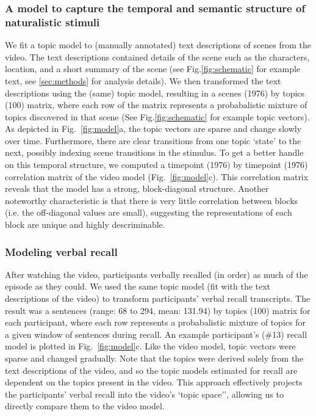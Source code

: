 \documentclass{article}
\begin{document}
{\subsubsection{A model to capture the temporal and semantic structure of naturalistic stimuli}
We fit a topic model \citep{BleiEtal03} to (manually annotated) text descriptions of scenes from the video. The text descriptions contained details of the scene such as the characters, location, and a short summary of the scene (see Fig.\ref{fig:schematic} for example text, see \ref{sec:methods} for analysis details). We then transformed the text descriptions using the (same) topic model, resulting in a scenes (1976) by topics (100) matrix, where each row of the matrix represents a probabalistic mixture of topics discovered in that scene (See Fig.\ref{fig:schematic} for example topic vectors). As depicted in Fig.~\ref{fig:model}a, the topic vectors are sparse and change slowly over time. Furthermore, there are clear transitions from one topic `state' to the next, possibly indexing scene transitions in the stimulus. To get a better handle on this temporal structure, we computed a timepoint (1976) by timepoint (1976) correlation matrix of the video model (Fig.~\ref{fig:model}c).  This correlation matrix reveals that the model has a strong, block-diagonal structure. Another noteworthy characteristic is that there is very little correlation between blocks (i.e. the off-diagonal values are small), suggesting the representations of each block are unique and highly descriminable.

\subsubsection{Modeling verbal recall}
After watching the video, participants verbally recalled (in order) as much of the episode as they could.  We used the same topic model (fit with the text descriptions of the video) to transform participants' verbal recall transcripts. The result was a sentences (range: 68 to 294, mean: 131.94) by topics (100) matrix for each participant, where each row represents a probabalistic mixture of topics for a given window of sentences during recall. An example participant's (\#13) recall model is plotted in Fig.~\ref{fig:model}c. Like the video model, topic vectors were sparse and changed gradually.  Note that the topics were derived solely from the text descriptions of the video, and so the topic models estimated for recall are dependent on the topics present in the video. This approach effectively projects the participants' verbal recall into the video's `topic space'', allowing us to directly compare them to the video model.

}
\end{document}
